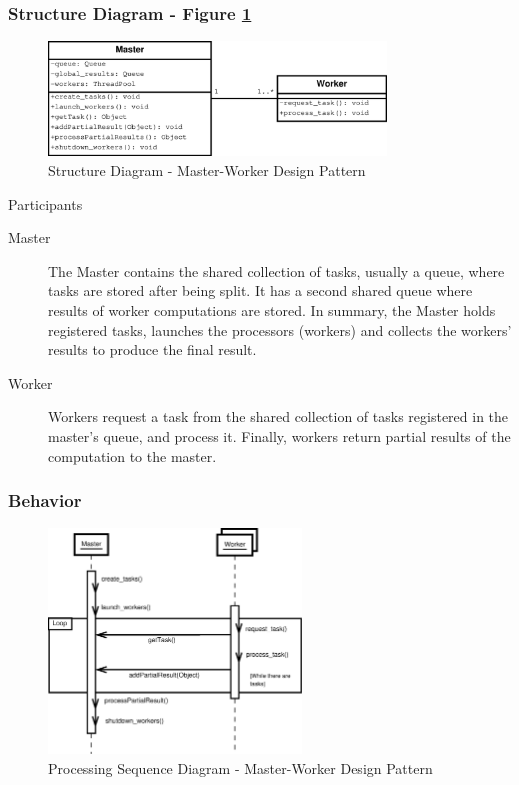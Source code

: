 \subsubsection{Structure Diagram - Figure \ref{fig:str_diagram_mw}}

\begin{figure}
	\centering
	\includegraphics*[width=0.8\textwidth, keepaspectratio=false]{fig/image7.eps}
	\caption{Structure Diagram - Master-Worker Design Pattern}
	\label{fig:str_diagram_mw}
\end{figure}


\begin{description}
	\item[Participants]
\end{description}

\begin{description}
	\item[Master]
	\label{it:masterdesc}
	The Master contains the shared collection of tasks, usually a queue, where tasks are stored after being split.  It has a second shared queue where results of worker computations are stored. In summary, the Master holds registered tasks, launches the processors (workers) and collects the workers' results to produce the final result.
	
	\item[Worker]
	\label{it:workerdesc}
	Workers request a task from the shared collection of tasks registered in the master's queue, and process it. Finally, workers return partial results of the computation to the master.
\end{description}

\subsubsection{Behavior}
\label{subsubsec:beh_mw_design_pattern}

\begin{figure}
	\centering
	\includegraphics*[width=0.6\textwidth, keepaspectratio=false]{fig/image29.eps}
	\caption{Processing Sequence Diagram - Master-Worker Design Pattern}
	\label{fig:seq_diagram_mw}
\end{figure}

